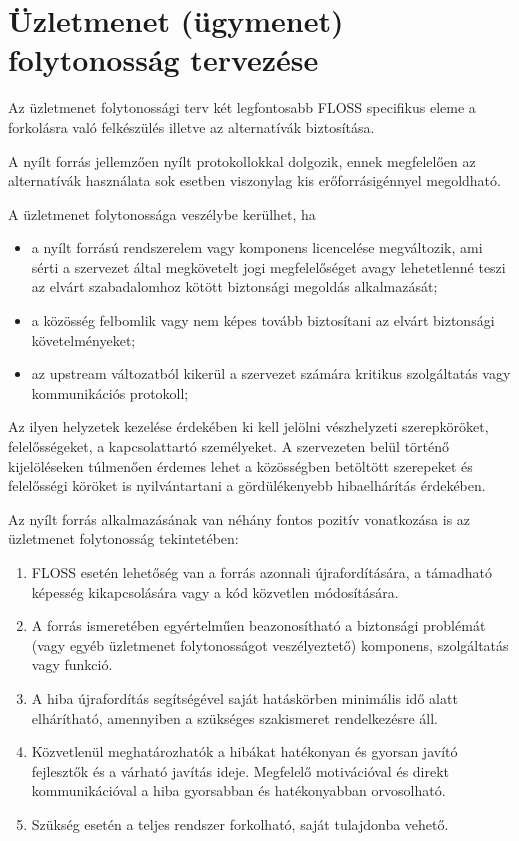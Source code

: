 \documentclass[12pt,magyar,a4paper,oneside]{scrreprt}
\providecommand{\tightlist}{%
  \setlength{\itemsep}{0pt}\setlength{\parskip}{0pt}}
\begin{document}
\hypertarget{uxfczletmenet-uxfcgymenet-folytonossuxe1g-tervezuxe9se}{%
\section{Üzletmenet (ügymenet) folytonosság
tervezése}\label{uxfczletmenet-uxfcgymenet-folytonossuxe1g-tervezuxe9se}}

Az üzletmenet folytonossági terv két legfontosabb FLOSS specifikus eleme
a forkolásra való felkészülés illetve az alternatívák biztosítása.

A nyílt forrás jellemzően nyílt protokollokkal dolgozik, ennek
megfelelően az alternatívák használata sok esetben viszonylag kis
erőforrásigénnyel megoldható.

A üzletmenet folytonossága veszélybe kerülhet, ha

\begin{itemize}
\tightlist
\item
  a nyílt forrású rendszerelem vagy komponens licencelése megváltozik,
  ami sérti a szervezet által megkövetelt jogi megfelelőséget avagy
  lehetetlenné teszi az elvárt szabadalomhoz kötött biztonsági megoldás
  alkalmazását;
\item
  a közösség felbomlik vagy nem képes tovább biztosítani az elvárt
  biztonsági követelményeket;
\item
  az upstream változatból kikerül a szervezet számára kritikus
  szolgáltatás vagy kommunikációs protokoll;
\end{itemize}

Az ilyen helyzetek kezelése érdekében ki kell jelölni vészhelyzeti
szerepköröket, felelősségeket, a kapcsolattartó személyeket. A
szervezeten belül történő kijelöléseken túlmenően érdemes lehet a
közösségben betöltött szerepeket és felelősségi köröket is
nyilvántartani a gördülékenyebb hibaelhárítás érdekében.

Az nyílt forrás alkalmazásának van néhány fontos pozitív vonatkozása is
az üzletmenet folytonosság tekintetében:

\begin{enumerate}
\def\labelenumi{\arabic{enumi}.}
\tightlist
\item
  FLOSS esetén lehetőség van a forrás azonnali újrafordítására, a
  támadható képesség kikapcsolására vagy a kód közvetlen módosítására.
\item
  A forrás ismeretében egyértelműen beazonosítható a biztonsági
  problémát (vagy egyéb üzletmenet folytonosságot veszélyeztető)
  komponens, szolgáltatás vagy funkció.
\item
  A hiba újrafordítás segítségével saját hatáskörben minimális idő alatt
  elhárítható, amennyiben a szükséges szakismeret rendelkezésre áll.
\item
  Közvetlenül meghatározhatók a hibákat hatékonyan és gyorsan javító
  fejlesztők és a várható javítás ideje. Megfelelő motivációval és
  direkt kommunikációval a hiba gyorsabban és hatékonyabban orvosolható.
\item
  Szükség esetén a teljes rendszer forkolható, saját tulajdonba vehető.
\end{enumerate}
\end{document}
